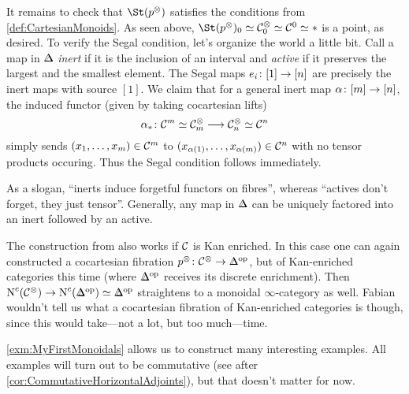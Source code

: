 \documentclass[a4paper, 10pt, oneside, DIV=9, chapterprefix=true, numbers=enddot,bibliography=totoc]{scrbook}
\begin{document}
\begin{exm}
\begin{alphanumerate}
		It remains to check that $\St (p^\otimes)$ satisfies the conditions from \cref{def:CartesianMonoids}. As seen above, $\St (p^\otimes)_0\simeq \Cc_0^\otimes \simeq \Cc^0\simeq *$ is a point, as desired. To verify the Segal condition, let's organize the world a little bit. Call a map in $\IDelta$ \emph{inert} if it is the inclusion of an interval and \emph{active} if it preserves the largest and the smallest element. The Segal maps $e_i\colon [1]\morphism {}[n]$ are precisely the inert maps with source $[1]$. We claim that for a general inert map $\alpha\colon [m]\morphism{[n]}$, the induced functor (given by taking cocartesian lifts) 
		\begin{equation*}
			\alpha_*\colon \Cc^m\simeq \Cc_m^\otimes \morphism \Cc_n^\otimes \simeq \Cc^n
		\end{equation*}
		simply sends $(x_1,\dotsc,x_m)\in \mathcal{C}^m$ to $(x_{\alpha(1)},\dotsc,x_{\alpha(m)})\in \mathcal{C}^n$ with no tensor products occuring. Thus the Segal condition follows immediately.
		
		As a slogan, \enquote{inerts induce forgetful functors on fibres}, whereas \enquote{actives don't forget, they just tensor}. Generally, any map in $\IDelta$ can be uniquely factored into an inert followed by an active.
		\item The construction from  also works if $\mathcal{C}$ is Kan enriched. In this case one can again constructed a cocartesian fibration $p^\otimes\colon \Cc^\otimes \morphism \IDelta^\op$, but of Kan-enriched categories this time (where $\IDelta^\op$ receives its discrete enrichment). Then $\N^c(\Cc^\otimes)\morphism \N^c(\IDelta^\op)\simeq \IDelta^\op$ straightens to a monoidal $\infty$-category as well. Fabian wouldn't tell us what a cocartesian fibration of Kan-enriched categories is though, since this would take---not a lot, but too much---time.
	\end{alphanumerate}
\end{exm}
\cref{exm:MyFirstMonoidals} allows us to construct many interesting examples. All examples will turn out to be commutative (see after \cref{cor:CommutativeHorizontalAdjoints}), but that doesn't matter for now.
\end{document}
